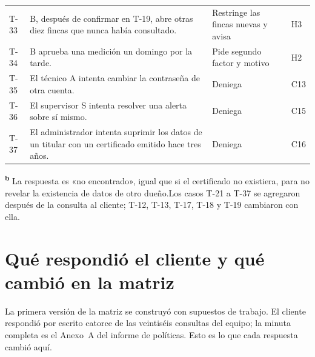 \documentclass[11pt,letterpaper]{article}
\newcommand{\cnd}[1]{\textsuperscript{\rmfamily\bfseries #1}}   %
\begin{document}
{\begin{longtable}{@{}L{0.9cm} L{9.5cm} L{2.9cm} L{2.2cm}@{}}
T-33 & B, después de confirmar en T-19, abre otras diez fincas que nunca había consultado. & Restringe las fincas nuevas y avisa & H3 \\
T-34 & B aprueba una medición un domingo por la tarde. & Pide segundo factor y motivo & H2 \\
T-35 & El técnico A intenta cambiar la contraseña de otra cuenta. & Deniega & C13 \\
T-36 & El supervisor S intenta resolver una alerta sobre sí mismo. & Deniega & C15 \\
T-37 & El administrador intenta suprimir los datos de un titular con un certificado emitido hace tres años. & Deniega & C16 \\
\end{longtable}
}

{\footnotesize\cnd{b} La respuesta es «no encontrado», igual que si el certificado no existiera, para no
revelar la existencia de datos de otro dueño.\quad Los casos T-21 a T-37 se agregaron después de la
consulta al cliente; T-12, T-13, T-17, T-18 y T-19 cambiaron con ella.}

\section{Qué respondió el cliente y qué cambió en la matriz}
\label{sec:minuta}

La primera versión de la matriz se construyó con supuestos de trabajo. El cliente respondió por
escrito catorce de las veintiséis consultas del equipo; la minuta completa es el Anexo~A del informe
de políticas. Esto es lo que cada respuesta cambió aquí.
\end{document}
